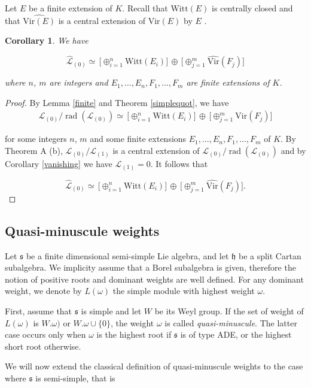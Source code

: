 \documentclass[11pt, letterpaper, reqno]{amsart}
\newtheorem{cor}[theorem]{Corollary}
\theoremstyle{definition}
\newcommand{\rad}{\operatorname{rad}}
\newcommand{\cL}{\mathcal L}
\newcommand{\fh}{\mathfrak{h}}
\newcommand{\fs}{\mathfrak{s}}
\newcommand{\Vir}{\mathrm{Vir}}
\newcommand{\Witt}{\mathrm{Witt}}
\begin{document}
Let $E$ be a finite extension of $K$. Recall that 
$\Witt(E)$ is centrally closed \cite{Fuks} and that
$\widehat{\Vir(E)}$ is a central extension of
$\Vir(E)$ by $E$ \cite{Fuks}.

\begin{cor}\label{L0} We have

 $$
\widehat{\cL}_{(0)}\simeq 
\,\big[\oplus_{i=1}^n\Witt(E_i)\big]\,\oplus 
\,\big[\oplus_{j=1}^m\widehat{\Vir}(F_j)\big]
$$

\noindent where 
$n$, $m$ are integers and 
$E_1,\ldots,E_n,F_1,\ldots, F_m$ are finite extensions of $K$.
\end{cor}

\begin{proof} By Lemma \ref{finite} and Theorem \ref{simplequot},
we have
\begin{align*}
\cL_{(0)}/\rad(\cL_{(0)})\simeq 
\,\big[\oplus_{i=1}^n\Witt(E_i)\big]\,\oplus 
\,\big[\oplus_{j=1}^m{\Vir}(F_j)\big]
\end{align*}

\noindent for some integers 
$n$, $m$ and some finite extensions 
$E_1,\ldots,E_n,F_1,\ldots, F_m$ of $K$.
By Theorem A (b), $\cL_{(0)}/\cL_{(1)}$ is a central extension
of $\cL_{(0)}/\rad(\cL_{(0)})$ and by 
Corollary \ref{vanishing} we have
$\cL_{(1)}=0$. It follows that

$$
\widehat{\cL}_{(0)}\simeq 
\,\big[\oplus_{i=1}^n\Witt(E_i)\big]\,\oplus 
\,\big[\oplus_{j=1}^m\widehat{\Vir}(F_j)\big].
$$
\end{proof}


\subsection{Quasi-minuscule weights}

Let $\fs$ be a finite dimensional semi-simple Lie algebra,
and let $\fh$ be a split Cartan subalgebra.
We implicity assume that a Borel subalgebra is given, therefore the notion of
positive roots and dominant weights are well
defined.  For any dominant weight, we denote by
$L(\omega)$ the simple module with highest weight 
$\omega$.

First, assume that $\fs$ is simple and let
$W$ be its Weyl group. If the set of weight
of $L(\omega)$ is $W.\omega)$
or $W.\omega\cup\{0\}$, the weight $\omega$ is called {\it quasi-minuscule}. The latter case occurs only when $\omega$ is the highest  root if $\fs$ is of type ADE, or the highest short
root otherwise.

We will now extend the classical definition 
of quasi-minuscule weights to the
 case where $\fs$ is semi-simple, that is
\end{document}
